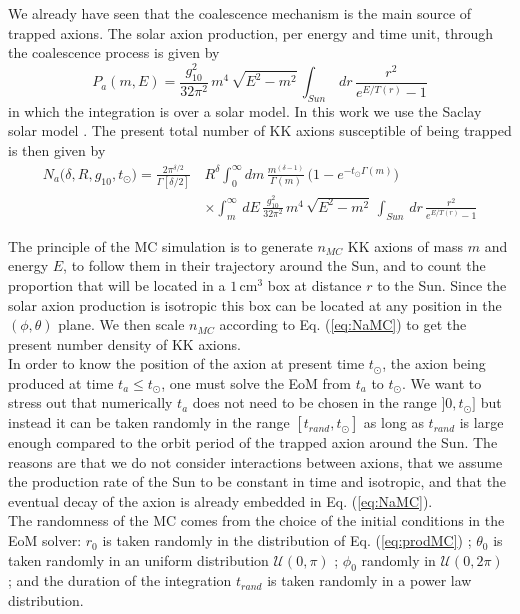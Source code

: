 \documentclass[a4paper]{article} %
\begin{document}
We already have seen that the coalescence mechanism is the main source of trapped axions. The solar axion production, per energy and time unit, through the coalescence process is given by
\begin{equation}
	P_a(m, E) = \frac{g_{10}^2}{32\pi^2}\,m^4\,\sqrt{E^2 - m^2}\,\int_{Sun}\,dr\, \frac{r^2}{e^{E/T(r)} -1}
	\label{eq:prodMC}
\end{equation}
in which the integration is over a solar model. In this work we use the Saclay solar model \cite{SaclayModel}. The present total number of KK axions susceptible of being trapped is then given by
\begin{equation}
\begin{split}
	N_a\big(\delta, R, g_{10}, t_\odot\big) = \frac{2\pi^{\delta/2}}{\Gamma[\delta/2]}\,&R^{\delta}\int_0^\infty dm \,  \frac{m^{(\delta-1)}}{\Gamma(m)}\,\bigg(1-e^{-t_\odot\Gamma(m)}\bigg) \\
	& \times \int_m^\infty \, dE\, \frac{g_{10}^2}{32\pi^2}\,m^4\,\sqrt{E^2 - m^2}\,\int_{Sun}\,dr\, \frac{r^2}{e^{E/T(r)} -1}
\end{split}
\label{eq:NaMC}
\end{equation}

The principle of the MC simulation is to generate $n_{MC}$ KK axions of mass $m$ and energy $E$, to follow them in their trajectory around the Sun, and to count the proportion that will be located in a $1\,\mathrm{cm^3}$ box at distance $r$ to the Sun. Since the solar axion production is isotropic this box can be located at any position in the $(\phi, \theta)$ plane. We then scale $n_{MC}$ according to Eq. (\ref{eq:NaMC}) to get the present number density of KK axions.\\

In order to know the position of the axion at present time $t_\odot$, the axion being produced at time $t_a \leq t_\odot$, one must solve the EoM from $t_a$ to $t_\odot$. We want to stress out that numerically $t_a$ does not need to be chosen in the range $]0, t_\odot]$ but instead it can be taken randomly in the range $[t_{rand}, t_\odot]$ as long as $t_{rand}$ is large enough compared to the orbit period of the trapped axion around the Sun. The reasons are that we do not consider interactions between axions, that we assume the production rate of the Sun to be constant in time and isotropic, and that the eventual decay of the axion is already embedded in Eq. (\ref{eq:NaMC}).\\

The randomness of the MC comes from the choice of the initial conditions in the EoM solver: $r_0$ is taken randomly in the distribution of Eq. (\ref{eq:prodMC}) ; $\theta_0$ is taken randomly in an uniform distribution $\mathcal{U}(0, \pi)$ ; $\phi_0$ randomly in $\mathcal{U}(0, 2\pi)$ ; and the duration of the integration $t_{rand}$ is taken randomly in a power law distribution.\\
\end{document}
